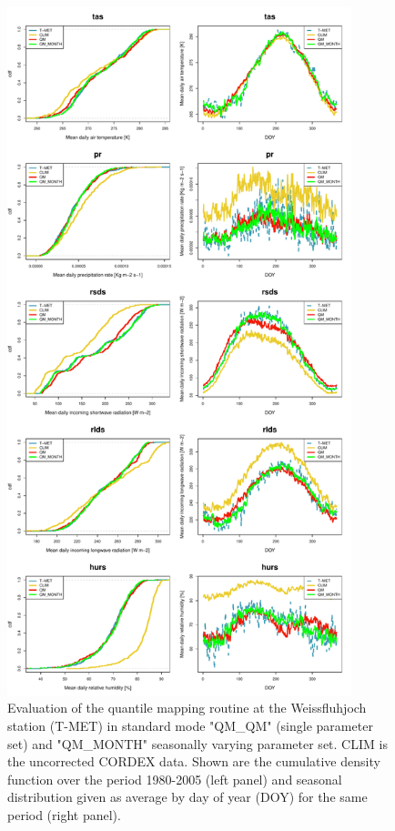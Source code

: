 \documentclass[hess, manuscript]{copernicus}
\begin{document}
\begin{figure}[t]
\includegraphics[width=10cm]{"plots/evalplot_singleModel_season.pdf"}
\caption{ Evaluation of the quantile mapping routine at the Weissfluhjoch station (T-MET) in standard mode "QM\_QM" (single parameter set) and "QM\_MONTH" seasonally varying parameter set. CLIM is the uncorrected CORDEX data. Shown are the cumulative density function over the period 1980-2005 (left panel) and seasonal distribution given as average by day of year (DOY) for the same period (right panel). }
\end{figure}
\end{document}
